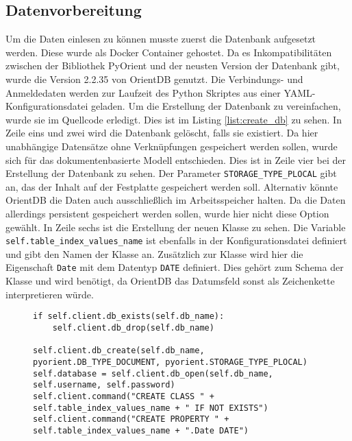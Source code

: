 
\subsection{Datenvorbereitung}
\label{sec:datenvorbereitung}

Um die Daten einlesen zu können musste zuerst die Datenbank aufgesetzt werden. Diese wurde als Docker Container gehostet. Da es Inkompatibilitäten zwischen der Bibliothek PyOrient und der neusten Version der Datenbank gibt, wurde die Version 2.2.35 von OrientDB genutzt. Die Verbindungs- und Anmeldedaten werden zur Laufzeit des Python Skriptes aus einer \gls{YAML}-Konfigurationsdatei geladen. Um die Erstellung der Datenbank zu vereinfachen, wurde sie im Quellcode erledigt. Dies ist im Listing \ref{list:create_db} zu sehen. In Zeile eins und zwei wird die Datenbank gelöscht, falls sie existiert. Da hier unabhängige Datensätze ohne Verknüpfungen gespeichert werden sollen, wurde sich für das dokumentenbasierte Modell entschieden. Dies ist in Zeile vier bei der Erstellung der Datenbank zu sehen. Der Parameter \texttt{STORAGE\_TYPE\_PLOCAL} gibt an, das der Inhalt auf der Festplatte gespeichert werden soll. Alternativ könnte OrientDB die Daten auch ausschließlich im Arbeitsspeicher halten. Da die Daten allerdings persistent gespeichert werden sollen, wurde hier nicht diese Option gewählt. In Zeile sechs ist die Erstellung der neuen Klasse zu sehen. Die Variable \texttt{self.table\_index\_values\_name} ist ebenfalls in der Konfigurationsdatei definiert und gibt den Namen der Klasse an. Zusätzlich zur Klasse wird hier die Eigenschaft \texttt{Date} mit dem Datentyp \texttt{DATE} definiert. Dies gehört zum Schema der Klasse und wird benötigt, da OrientDB das Datumsfeld sonst als Zeichenkette interpretieren würde.

\begin{figure}[!htb]
    \begin{lstlisting}[caption=Anlegen und initialiseren einer Datenbank in Python, label=list:create_db]
if self.client.db_exists(self.db_name):
    self.client.db_drop(self.db_name)

self.client.db_create(self.db_name, pyorient.DB_TYPE_DOCUMENT, pyorient.STORAGE_TYPE_PLOCAL)
self.database = self.client.db_open(self.db_name, self.username, self.password)
self.client.command("CREATE CLASS " + self.table_index_values_name + " IF NOT EXISTS")
self.client.command("CREATE PROPERTY " + self.table_index_values_name + ".Date DATE")
    \end{lstlisting}
\end{figure}

